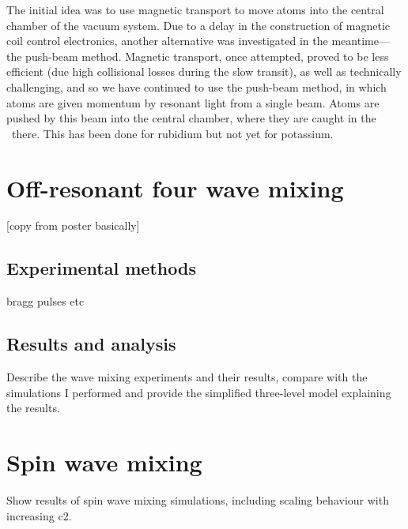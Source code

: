 The initial idea was to use magnetic transport to move atoms into the central chamber of the vacuum system. Due to a delay in the construction of magnetic coil control electronics, another alternative was investigated in the meantime---the push-beam method. Magnetic transport, once attempted, proved to be less efficient (due high collisional losses during the slow transit), as well as technically challenging, and so we have continued to use the push-beam method, in which atoms are given momentum by resonant light from a single beam. Atoms are pushed by this beam into the central chamber, where they are caught in the \mot\ there. This has been done for rubidium but not yet for potassium.


\section{Off-resonant four wave mixing}

    [copy from poster basically]

    \subsection{Experimental methods}

    \null\newpage
    \null\newpage
    \null\newpage
    \null\newpage

    bragg pulses etc
    \subsection{Results and analysis}

    \null\newpage
    \null\newpage
    \null\newpage
    \null\newpage

Describe the wave mixing experiments and their results, compare with the simulations I performed and provide the simplified three-level model explaining the results.

\section{Spin wave mixing}
Show results of spin wave mixing simulations, including scaling behaviour with increasing c2.

\null\newpage
\null\newpage
\null\newpage
\null\newpage